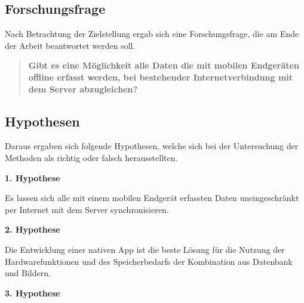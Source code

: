 \subsection{Forschungsfrage}
\label{subsec:problem:prob}

Nach Betrachtung der Zielstellung ergab sich eine Forschungsfrage, die am Ende der Arbeit beantwortet werden soll.

\begin{quote}
	\textbf {Gibt es eine Möglichkeit alle Daten die mit mobilen Endgeräten offline erfasst werden, bei bestehender Internetverbindung mit dem Server abzugleichen?}
\end{quote}

\subsection{Hypothesen}
\label{subsec:hypothesis:hypo}

Daraus ergaben sich folgende Hypothesen, welche sich bei der Untersuchung der Methoden als richtig oder falsch herausstellten.

\textbf {1. Hypothese}

Es lassen sich alle mit einem mobilen Endgerät erfassten Daten uneingeschränkt per Internet mit dem Server synchronisieren.

\textbf {2. Hypothese}

Die Entwicklung einer nativen App ist die beste Lösung für die Nutzung der Hardwarefunktionen und des Speicherbedarfs der Kombination aus Datenbank und Bildern.

\textbf {3. Hypothese}
